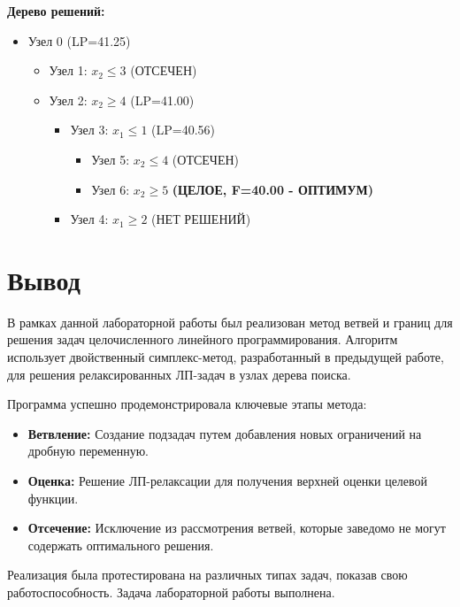 \documentclass[oneside,a4paper,14pt]{extarticle}
\begin{document}
\textbf{Дерево решений:}
\begin{itemize}
    \item Узел 0 (LP=41.25)
    \begin{itemize}
        \item Узел 1: $x_2 \le 3$ (ОТСЕЧЕН)
        \item Узел 2: $x_2 \ge 4$ (LP=41.00)
        \begin{itemize}
            \item Узел 3: $x_1 \le 1$ (LP=40.56)
            \begin{itemize}
                \item Узел 5: $x_2 \le 4$ (ОТСЕЧЕН)
                \item Узел 6: $x_2 \ge 5$ \textbf{(ЦЕЛОЕ, F=40.00 - ОПТИМУМ)}
            \end{itemize}
            \item Узел 4: $x_1 \ge 2$ (НЕТ РЕШЕНИЙ)
        \end{itemize}
    \end{itemize}
\end{itemize}

\section{Вывод}
В рамках данной лабораторной работы был реализован метод ветвей и границ для решения задач целочисленного линейного программирования. Алгоритм использует двойственный симплекс-метод, разработанный в предыдущей работе, для решения релаксированных ЛП-задач в узлах дерева поиска.

Программа успешно продемонстрировала ключевые этапы метода:
\begin{itemize}
    \item \textbf{Ветвление:} Создание подзадач путем добавления новых ограничений на дробную переменную.
    \item \textbf{Оценка:} Решение ЛП-релаксации для получения верхней оценки целевой функции.
    \item \textbf{Отсечение:} Исключение из рассмотрения ветвей, которые заведомо не могут содержать оптимального решения.
\end{itemize}
Реализация была протестирована на различных типах задач, показав свою работоспособность. Задача лабораторной работы выполнена.
\end{document}
